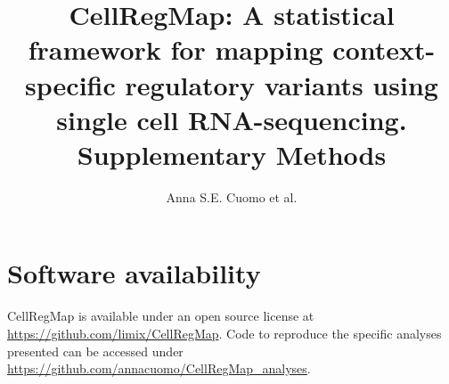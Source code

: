 \documentclass[10pt]{article}
\title{CellRegMap: A statistical framework for mapping  context-specific regulatory variants using single cell RNA-sequencing. \\ \verylarge\textbf{Supplementary Methods}}
\author{Anna S.E. Cuomo et al.}
\date{}
\begin{document}
\maketitle
\clearpage

\tableofcontents








% 
\section{Software availability}
CellRegMap is available under an open source license at \url{https://github.com/limix/CellRegMap}. 
Code to reproduce the specific analyses presented can be accessed under \url{https://github.com/annacuomo/CellRegMap_analyses}. 
 

\end{document}
